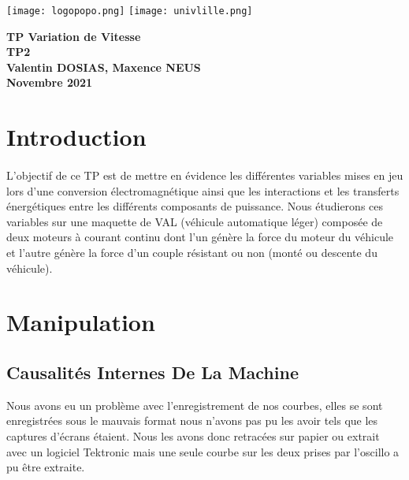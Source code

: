 \documentclass[oneside,a4paper,12pt]{article}
\begin{document}
	\begin{titlepage}
		\texttt{[image: logopopo.png]}
		\hspace*{\fill}
		\texttt{[image: univlille.png]}
		
		\begin{center}
			\vspace{1cm}
			\textbf{TP Variation de Vitesse}\\
			\textbf{TP2 }\\
			\vspace{1cm}
			\textbf{Valentin DOSIAS, Maxence NEUS}\\
			\vspace{\fill}
			\textbf{Novembre 2021}\\
		\end{center}
	\end{titlepage}
	
	\tableofcontents
	
	\section{Introduction}
	\paragraph{}
	L’objectif de ce TP est de mettre en évidence les différentes variables mises en jeu lors d’une conversion électromagnétique ainsi que les interactions et les transferts énergétiques entre les différents composants de puissance. Nous étudierons ces variables sur une maquette de VAL (véhicule automatique léger) composée de deux moteurs à courant continu dont l’un génère la force du moteur du véhicule et l’autre génère la force d’un couple résistant ou non (monté ou descente du véhicule).
		
	\newpage
			
	\section{Manipulation}
	
	
	\subsection{Causalités Internes De La Machine}
	
		Nous avons eu un problème avec l’enregistrement de nos courbes, elles se sont enregistrées sous le mauvais format nous n’avons pas pu les avoir tels que les captures d’écrans étaient. Nous les avons donc retracées sur papier ou extrait avec un logiciel Tektronic mais une seule courbe sur les deux prises par l’oscillo a pu être extraite.
		
\end{document}
